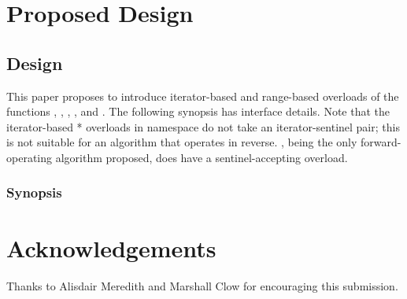 \section{Proposed Design}

\subsection{Design}

This paper proposes to introduce iterator-based and range-based overloads of
the functions , ,
, , and
.  The following synopsis has interface details.  Note that
the iterator-based * overloads in namespace  do
not take an iterator-sentinel pair; this is not suitable for an algorithm that
operates in reverse.  , being the only forward-operating
algorithm proposed, does have a sentinel-accepting overload.

\subsubsection{ Synopsis}




\section{Acknowledgements}

Thanks to Alisdair Meredith and Marshall Clow for encouraging this submission.
